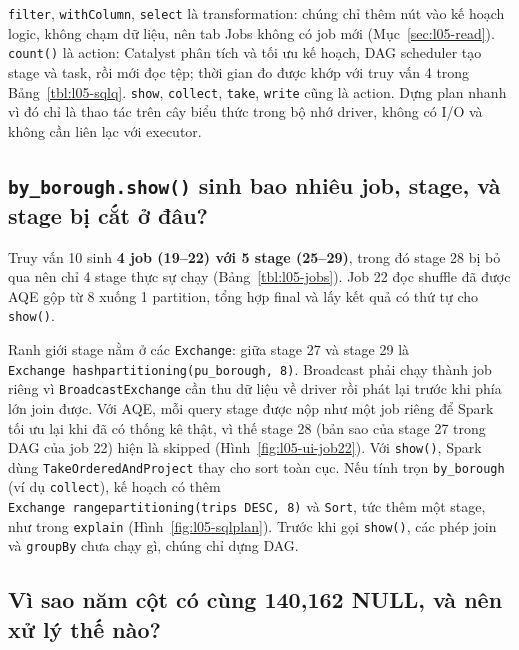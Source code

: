 \documentclass[
  12pt,
  a4paper,
]{article}
\begin{document}
\texttt{filter}, \texttt{withColumn}, \texttt{select} là transformation:
chúng chỉ thêm nút vào kế hoạch logic, không chạm dữ liệu, nên tab Jobs
không có job mới (Mục~\ref{sec:l05-read}). \texttt{count()} là action:
Catalyst phân tích và tối ưu kế hoạch, DAG scheduler tạo stage và task,
rồi mới đọc tệp; thời gian đo được khớp với truy vấn 4 trong
Bảng~\ref{tbl:l05-sqlq}. \texttt{show}, \texttt{collect}, \texttt{take},
\texttt{write} cũng là action. Dựng plan nhanh vì đó chỉ là thao tác
trên cây biểu thức trong bộ nhớ driver, không có I/O và không cần liên
lạc với executor.

\subsection{\texorpdfstring{\texttt{by\_}\allowbreak{}\texttt{borough.}\allowbreak{}\texttt{show()}\allowbreak{}
sinh bao nhiêu job, stage, và stage bị cắt ở
đâu?}{by\_borough.show() sinh bao nhiêu job, stage, và stage bị cắt ở đâu?}}\label{sec:l05-q3}

Truy vấn 10 sinh \textbf{4 job (19--22) với 5 stage (25--29)}, trong đó
stage 28 bị bỏ qua nên chỉ 4 stage thực sự chạy
(Bảng~\ref{tbl:l05-jobs}). Job 22 đọc shuffle đã được AQE gộp từ 8 xuống
1 partition, tổng hợp final và lấy kết quả có thứ tự cho
\texttt{show()}.

Ranh giới stage nằm ở các \texttt{Exchange}: giữa stage 27 và stage 29
là
\texttt{Exchange\ hashpartitioning(pu\_}\allowbreak{}\texttt{borough,}\allowbreak{}\texttt{\ 8)}\allowbreak{}.
Broadcast phải chạy thành job riêng vì
\texttt{BroadcastExchange}\allowbreak{} cần thu dữ liệu về driver rồi
phát lại trước khi phía lớn join được. Với AQE, mỗi query stage được nộp
như một job riêng để Spark tối ưu lại khi đã có thống kê thật, vì thế
stage 28 (bản sao của stage 27 trong DAG của job 22) hiện là skipped
(Hình~\ref{fig:l05-ui-job22}). Với \texttt{show()}, Spark dùng
\texttt{TakeOrderedAndProject}\allowbreak{} thay cho sort toàn cục. Nếu
tính trọn \texttt{by\_borough} (ví dụ \texttt{collect}), kế hoạch có
thêm
\texttt{Exchange\ rangepartitioning(trips\ DESC,}\allowbreak{}\texttt{\ 8)}\allowbreak{}
và \texttt{Sort}, tức thêm một stage, như trong \texttt{explain}
(Hình~\ref{fig:l05-sqlplan}). Trước khi gọi \texttt{show()}, các phép
join và \texttt{groupBy} chưa chạy gì, chúng chỉ dựng DAG.

\subsection{Vì sao năm cột có cùng 140,162 NULL, và nên xử lý thế
nào?}\label{sec:l05-q4}
\end{document}
